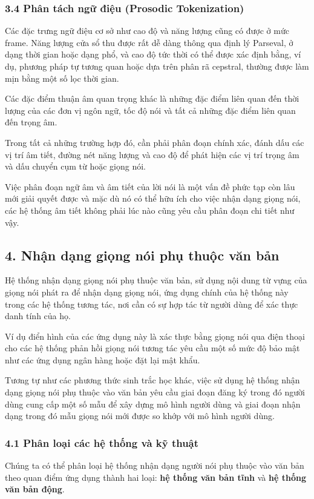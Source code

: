 \documentclass{article}
\begin{document}
	\subsubsection{3.4 Phân tách ngữ điệu (Prosodic Tokenization)}
	\qquad Các đặc trưng ngữ điệu cơ sở như cao độ và năng lượng cũng có được ở mức frame. Năng lượng cửa sổ thu được rất dễ dàng thông qua định lý Parseval, ở dạng thời gian hoặc dạng phổ, và cao độ tức thời có thể được xác định bằng, ví dụ, phương pháp tự tương quan hoặc dựa trên phân rã cepstral, thường được làm mịn bằng một số lọc thời gian.
	
	 Các đặc điểm thuận âm quan trọng khác là những đặc điểm liên quan đến thời lượng của các đơn vị ngôn ngữ, tốc độ nói và tất cả những đặc điểm liên quan đến trọng âm. 
	 
	 Trong tất cả những trường hợp đó, cần phải phân đoạn chính xác, đánh dấu các vị trí âm tiết, đường nét năng lượng và cao độ để phát hiện các vị trí trọng âm và dấu chuyển cụm từ hoặc giọng nói. 
	 
	 Việc phân đoạn ngữ âm và âm tiết của lời nói là một vấn đề phức tạp còn lâu mới giải quyết được và mặc dù nó có thể hữu ích cho việc nhận dạng giọng nói, các hệ thống âm tiết không phải lúc nào cũng yêu cầu phân đoạn chi tiết như vậy.
	
	\subsection{4. Nhận dạng giọng nói phụ thuộc văn bản}
	
	\qquad Hệ thống nhận dạng giọng nói phụ thuộc văn bản, sử dụng nội dung từ vựng của giọng nói phát ra để nhận dạng giọng nói, ứng dụng chính của hệ thống này trong các hệ thống tương tác, nơi cần có sự hợp tác từ người dùng để xác thực danh tính của họ.
	
	Ví dụ điển hình của các ứng dụng này là xác thực bằng giọng nói qua điện thoại cho các hệ thống phản hồi giọng nói tương tác yêu cầu một số mức độ bảo mật như các ứng dụng ngân hàng hoặc đặt lại mật khẩu. 
	
	Tương tự như các phương thức sinh trắc học khác, việc sử dụng hệ thống nhận dạng giọng nói phụ thuộc vào văn bản yêu cầu giai đoạn đăng ký trong đó người dùng cung cấp một số mẫu để xây dựng mô hình người dùng và giai đoạn nhận dạng trong đó mẫu giọng nói mới được so khớp với mô hình người dùng.
		
	\subsubsection{4.1 Phân loại các hệ thống và kỹ thuật}
	\qquad Chúng ta có thể phân loại hệ thống nhận dạng người nói phụ thuộc vào văn bản theo quan điểm ứng dụng thành hai loại: \textbf{hệ thống văn bản tĩnh} và \textbf{hệ thống văn bản động}. 
	
\end{document}

